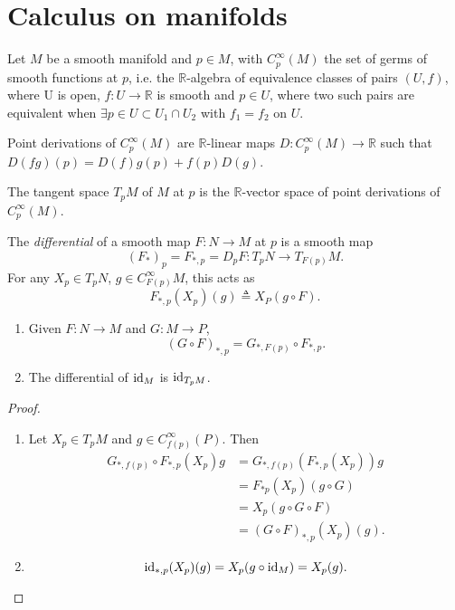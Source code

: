 \section{Calculus on manifolds}
Let $M$ be a smooth manifold and $p \in M$, with
$C_p^\infty(M)$ the set of germs of smooth functions at $p$, i.e. the
$\mathbb{R}$-algebra of equivalence classes of pairs $(U, f)$, where
U is open, $f: U \to \mathbb{R}$ is smooth and $p \in U$, where two
such pairs are equivalent when
$\exists p \in U \subset U_1 \cap U_2$ with $f_1 = f_2$ on $U$.

Point derivations of $C_p^\infty(M)$ are $\mathbb{R}$-linear maps
$D: C_p^\infty(M) \to \mathbb{R}$ such that
$D(fg)(p) = D(f) g(p) + f(p) D(g)$.

The tangent space $T_pM$ of $M$ at $p$ is the $\mathbb{R}$-vector space of
point derivations of $C_p^\infty(M)$.

\begin{defn}[Differential]
The \emph{differential} of a smooth map $F: N \to M$ at $p$ is a
smooth map
$$
(F_\ast)_p = F_{\ast,p} = D_p F : T_p N \to T_{F(p)} M.
$$
For any $X_p \in T_pN$, $g \in C_{F(p)}^\infty M$, this acts as
$$
F_{\ast,p}(X_p)(g) \triangleq X_P(g \circ F).
$$
\end{defn}

\begin{prop}
  \begin{enumerate}
    \item{
      Given $F: N \to M$ and $G: M \to P$,
      $$
        (G \circ F)_{\ast, p}
      = G_{\ast, F(p)} \circ F_{\ast, p}.
      $$
    }
    \item{
      The differential of $\mathrm{id}_M$ is $\mathrm{id}_{T_pM}$.
    }
  \end{enumerate}
\end{prop}
\begin{proof}
  \begin{enumerate}
    \item{
      Let $X_p \in T_pM$ and $g \in C_{f(p)}^\infty(P)$. Then
      \begin{align*}
         G_{\ast, f(p)} \circ F_{\ast, p} (X_p) g
      &= G_{\ast, f(p)} (F_{\ast, p} (X_p)) g \\
      &= F_{\ast p}(X_p) (g \circ G) \\
      &= X_p(g \circ G \circ F) \\
      &= (G \circ F)_{\ast, p}(X_p)(g).
      \end{align*}
    }
    \item{
      $$
        \mathrm{id}_{\ast,p}(X_p)(g)
      = X_p(g \circ \mathrm{id}_M)
      = X_p(g).
      $$
    }
  \end{enumerate}
\end{proof}

